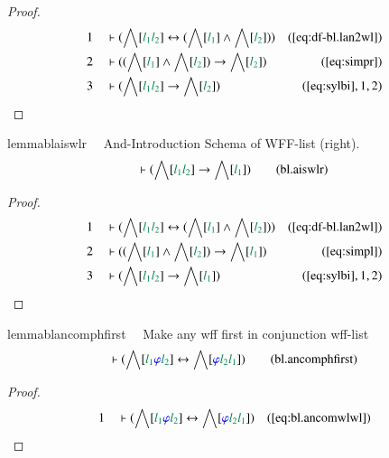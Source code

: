 \begin{proof}
\begin{align}
  1 &&  & \vdash ( \bigwedge[ \mwl{l_1} \mwl{l_2} ] \leftrightarrow (
      \bigwedge[ \mwl{l_1} ] \wedge \bigwedge[ \mwl{l_2} ]
      ) )&(\mbox{\ref{eq:df-bl.lan2wl}})\notag
  \\ 2 &&  & \vdash ( ( \bigwedge[ \mwl{l_1} ] \wedge \bigwedge[ \mwl{l_2} ] )
      \rightarrow \bigwedge[ \mwl{l_2} ]
      )&(\mbox{\ref{eq:simpr}})\notag
  \\ 3 &&  & \vdash ( \bigwedge[ \mwl{l_1} \mwl{l_2} ] \rightarrow \bigwedge[
      \mwl{l_2} ] )&(\mbox{\ref{eq:sylbi}},1,2)\notag
\end{align}
\end{proof}

\begin{restatable}{lemma}{blaiswlr}~~ And-Introduction Schema of WFF-list
(right).
\begin{align}
\vdash ( \bigwedge[ \mwl{l_1} \mwl{l_2} ] \rightarrow \bigwedge[ \mwl{l_1} ]
    )\label{eq:bl.aiswlr}\tag{bl.aiswlr}
\end{align}
\end{restatable}

\begin{proof}
\begin{align}
  1 &&  & \vdash ( \bigwedge[ \mwl{l_1} \mwl{l_2} ] \leftrightarrow (
      \bigwedge[ \mwl{l_1} ] \wedge \bigwedge[ \mwl{l_2} ]
      ) )&(\mbox{\ref{eq:df-bl.lan2wl}})\notag
  \\ 2 &&  & \vdash ( ( \bigwedge[ \mwl{l_1} ] \wedge \bigwedge[ \mwl{l_2} ] )
      \rightarrow \bigwedge[ \mwl{l_1} ]
      )&(\mbox{\ref{eq:simpl}})\notag
  \\ 3 &&  & \vdash ( \bigwedge[ \mwl{l_1} \mwl{l_2} ] \rightarrow \bigwedge[
      \mwl{l_1} ] )&(\mbox{\ref{eq:sylbi}},1,2)\notag
\end{align}
\end{proof}

\begin{restatable}{lemma}{blancomphfirst}~~ Make any wff first in conjunction
wff-list
\begin{align}
\vdash ( \bigwedge[ \mwl{l_1} \mw{\varphi} \mwl{l_2} ] \leftrightarrow
    \bigwedge[ \mw{\varphi} \mwl{l_2} \mwl{l_1} ]
    )\label{eq:bl.ancomphfirst}\tag{bl.ancomphfirst}
\end{align}
\end{restatable}

\begin{proof}
\begin{align}
  1 &&  & \vdash ( \bigwedge[ \mwl{l_1} \mw{\varphi} \mwl{l_2} ]
      \leftrightarrow \bigwedge[ \mw{\varphi} \mwl{l_2}
      \mwl{l_1} ] )&(\mbox{\ref{eq:bl.ancomwlwl}})\notag
\end{align}
\end{proof}

